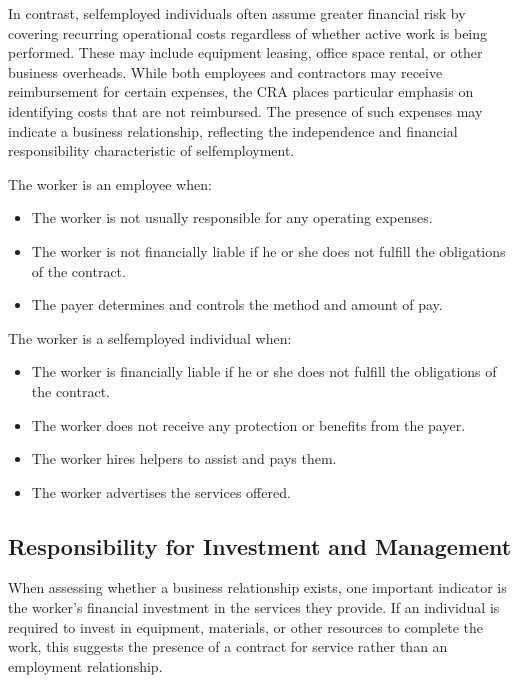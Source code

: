 \documentclass[letterpaper,10pt,english]{sphinxmanual}
\begin{document}
\sphinxAtStartPar
In contrast, self\sphinxhyphen{}employed individuals often assume greater financial risk by covering recurring operational costs
regardless of whether active work is being performed. These may include equipment leasing, office space rental, or other
business overheads. While both employees and contractors may receive reimbursement for certain expenses, the CRA places
particular emphasis on identifying costs that are not reimbursed. The presence of such expenses may indicate a business
relationship, reflecting the independence and financial responsibility characteristic of self\sphinxhyphen{}employment.

\sphinxAtStartPar
The worker is an employee when:
\begin{itemize}
\item {} 
\sphinxAtStartPar
The worker is not usually responsible for any operating expenses.

\item {} 
\sphinxAtStartPar
The worker is not financially liable if he or she does not fulfill the obligations of the contract.

\item {} 
\sphinxAtStartPar
The payer determines and controls the method and amount of pay.

\end{itemize}

\sphinxAtStartPar
The worker is a self\sphinxhyphen{}employed individual when:
\begin{itemize}
\item {} 
\sphinxAtStartPar
The worker is financially liable if he or she does not fulfill the obligations of the contract.

\item {} 
\sphinxAtStartPar
The worker does not receive any protection or benefits from the payer.

\item {} 
\sphinxAtStartPar
The worker hires helpers to assist and pays them.

\item {} 
\sphinxAtStartPar
The worker advertises the services offered.

\end{itemize}


\subsection{Responsibility for Investment and Management}
\label{\detokenize{3_contracts:responsibility-for-investment-and-management}}
\sphinxAtStartPar
When assessing whether a business relationship exists, one important indicator is the worker’s financial investment in the
services they provide. If an individual is required to invest in equipment, materials, or other resources to complete the
work, this suggests the presence of a contract for service rather than an employment relationship.
\end{document}
